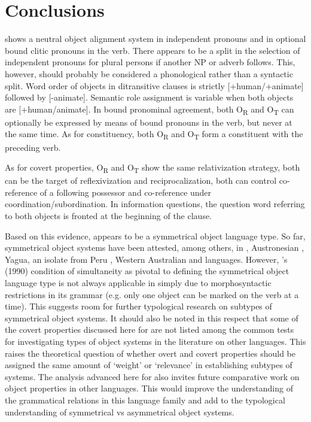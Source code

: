 \documentclass[output=paper]{langsci/langscibook}
\begin{document}
\section{Conclusions}\label{§7:conclusions.pacchiarotti}

 shows a neutral object alignment system in independent pronouns and in optional bound clitic pronouns in the verb. There appears to be a split in the selection of independent pronouns for plural persons if another NP or adverb follows. This, however, should probably be considered a phonological rather than a syntactic split. Word order of objects in ditransitive clauses is strictly [+human/+animate] followed by [-animate]. Semantic role assignment is variable when both objects are [+human/animate]. In bound pronominal agreement, both O\textsubscript{R} and O\textsubscript{T} can optionally be expressed by means of bound pronouns in the verb, but never at the same time. As for constituency, both O\textsubscript{R} and O\textsubscript{T} form a constituent with the preceding verb. 

As for covert properties, O\textsubscript{R} and O\textsubscript{T} show the same relativization strategy, both can be the target of reflexivization and reciprocalization, both can control co-reference of a following possessor and co-reference under coordination/subordination. In information questions, the question word referring to both objects is fronted at the beginning of the clause. 

Based on this evidence,  appears to be a symmetrical object language type. So far, symmetrical object systems have been attested, among others, in  \citep{bresnanmoshi1990}, Austronesian \citep{donohue1996}, Yagua, an isolate from Peru \citep{paynepayne1989}, Western Australian \citep{dench1995} and  \citep{mckaytrechsel2008} languages. However, \citeauthor{bresnanmoshi1990}'s (1990)  condition of simultaneity as pivotal to defining the symmetrical object language type is not always applicable in  simply due to morphosyntactic restrictions in its grammar (e.g. only one object can be marked on the verb at a time). This suggests room for further typological research on subtypes of symmetrical object systems. It should also be noted in this respect that some of the covert properties discussed here for  are not listed among the common tests for investigating types of object systems in the literature on other languages. This raises the theoretical question of whether overt and covert properties should be assigned the same amount of `weight' or `relevance' in establishing subtypes of systems. The analysis advanced here for  also invites future comparative work on object properties in other  languages. This would improve the understanding of the grammatical relations in this language family and add to the typological understanding of symmetrical vs asymmetrical object systems.
\end{document}
